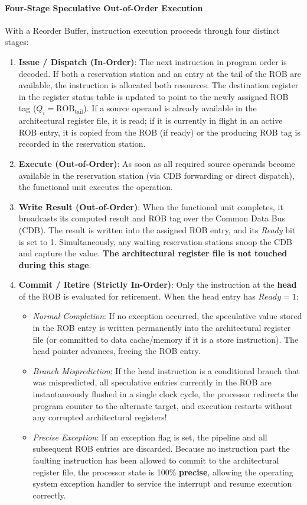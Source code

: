 \paragraph{Four-Stage Speculative Out-of-Order Execution}
With a Reorder Buffer, instruction execution proceeds through four distinct stages:
\begin{enumerate}
    \item \textbf{Issue / Dispatch (In-Order)}: The next instruction in program order is decoded. If both a reservation station and an entry at the tail of the ROB are available, the instruction is allocated both resources. The destination register in the register status table is updated to point to the newly assigned ROB tag ($Q_i = \text{ROB}_{\text{tail}}$). If a source operand is already available in the architectural register file, it is read; if it is currently in flight in an active ROB entry, it is copied from the ROB (if ready) or the producing ROB tag is recorded in the reservation station.
    \item \textbf{Execute (Out-of-Order)}: As soon as all required source operands become available in the reservation station (via CDB forwarding or direct dispatch), the functional unit executes the operation.
    \item \textbf{Write Result (Out-of-Order)}: When the functional unit completes, it broadcasts its computed result and ROB tag over the Common Data Bus (CDB). The result is written into the assigned ROB entry, and its \textit{Ready} bit is set to 1. Simultaneously, any waiting reservation stations snoop the CDB and capture the value. \textbf{The architectural register file is not touched during this stage}.
    \item \textbf{Commit / Retire (Strictly In-Order)}: Only the instruction at the \textbf{head} of the ROB is evaluated for retirement. When the head entry has $\textit{Ready} = 1$:
    \begin{itemize}
        \item \textit{Normal Completion}: If no exception occurred, the speculative value stored in the ROB entry is written permanently into the architectural register file (or committed to data cache/memory if it is a store instruction). The head pointer advances, freeing the ROB entry.
        \item \textit{Branch Misprediction}: If the head instruction is a conditional branch that was mispredicted, all speculative entries currently in the ROB are instantaneously flushed in a single clock cycle, the processor redirects the program counter to the alternate target, and execution restarts without any corrupted architectural registers!
        \item \textit{Precise Exception}: If an exception flag is set, the pipeline and all subsequent ROB entries are discarded. Because no instruction past the faulting instruction has been allowed to commit to the architectural register file, the processor state is 100\% \textbf{precise}, allowing the operating system exception handler to service the interrupt and resume execution correctly.
    \end{itemize}
\end{enumerate}

